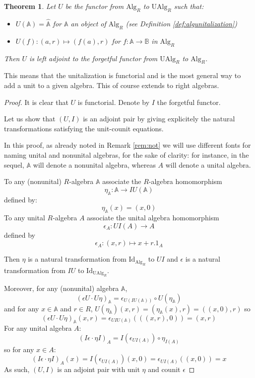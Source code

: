 \documentclass[a4paper,fleqn]{cas-sc}
\newtheorem{thm}{Theorem}%
\newcommand{\bA}{\mathbb{A}}
\newcommand{\bB}{\mathbb{B}}
\begin{document}
\begin{thm}
    Let $U$ be the functor from $\mathrm{Alg}_R$ to $\mathrm{UAlg}_R$ such that:
    \begin{itemize}
        \item $U(\bA) = \widehat{\bA}$ for $\bA$ an object of $\mathrm{Alg}_R$ (see Definition \ref{def:algunitalization})
        \item $U(f) : (a,r) \mapsto (f(a), r)$ for $f : \bA \to \bB$ in $\mathrm{Alg}_R$
    \end{itemize}
    
    Then $U$ is left adjoint to the forgetful functor from $\mathrm{UAlg}_R$ to $\mathrm{Alg}_R$.
\end{thm}

This means that the unitalization is functorial and is the most general way to add a unit to a given algebra. This of course extends to right algebras.

\begin{proof}
It is clear that $U$ is functorial. Denote by $I$ the forgetful functor.

Let us show that $(U,I)$ is an adjoint pair by giving explicitely the natural transformations satisfying the unit-counit equations.

In this proof, as already noted in Remark \ref{rem:not} we will use different fonts for naming unital and nonunital algebras, for the sake of clarity: for instance, in the sequel, $\bA$ will denote a nonunital algebra, whereas $A$ will denote a unital algebra. 

To any (nonunital) $R$-algebra $\bA$ associate the $R$-algebra homomorphism 
\[\eta_\bA : \bA \to IU(\bA) \]
defined by:
\[\eta_{\bA} (x) =
(x, 0)\]
To any unital $R$-algebra $A$ associate the unital algebra homomorphism 
\[\epsilon_{A} : UI(A) \to A\]
defined by
\[
\epsilon_{A} : (x,r) \mapsto  x + r.1_A
\]

Then $\eta$ is a natural transformation from $\mathrm{Id}_{\mathrm{Alg}_R}$ to $UI$ and $\epsilon$ is a natural transformation from $IU$ to $\mathrm{Id}_{\mathrm{UAlg}_R}$.

Moreover, for any (nonunital) algebra $\bA$,
\[
(\epsilon U \cdot U \eta)_\bA
= \epsilon_{U(IU(\bA))} \circ U(\eta_\bA) \]
and for any $x \in \bA$ and $r \in R$, $U(\eta_\bA) (x,r) = (\eta_\bA (x), r) = ((x,0), r)$ so 
\[ (\epsilon U \cdot U \eta)_\bA (x,r)
= \epsilon_{UIU(\bA)}( ((x,r), 0) )
= (x,r)
\]
For any unital algebra $A$:
\[
(I \epsilon \cdot \eta I)_{A} =
I(\epsilon_{UI(A)}) \circ \eta_{I(A)}
\]
so for any $x \in A$:
\[
(I \epsilon \cdot \eta I)_{A} (x)
= I(\epsilon_{UI(A)}) (x,0)
= \epsilon_{UI(A)} ((x,0))
= x
\]
As such, $(U,I)$ is an adjoint pair with unit $\eta$ and counit $\epsilon$

\end{proof}
\end{document}
